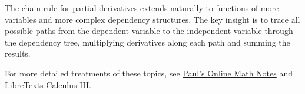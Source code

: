 \begin{remark}
  The chain rule for partial derivatives extends naturally to functions of more variables and more complex dependency structures. The key insight is to trace all possible paths from the dependent variable to the independent variable through the dependency tree, multiplying derivatives along each path and summing the results.
\end{remark}

For more detailed treatments of these topics, see \href{https://tutorial.math.lamar.edu/classes/calciii/chainrule.aspx}{Paul's Online Math Notes} and \href{https://math.libretexts.org/Courses/Monroe_Community_College/MTH_212_Calculus_III/Chapter_13:_Functions_of_Multiple_Variables_and_Partial_Derivatives/13.6:_Directional_Derivatives_and_the_Gradient}{LibreTexts Calculus III}.

